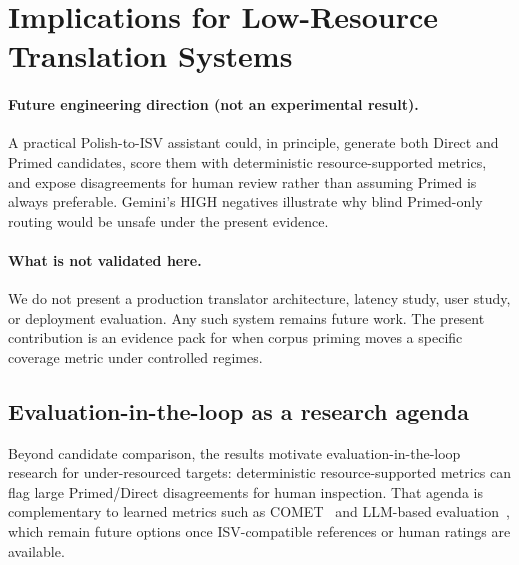 \section{Implications for Low-Resource Translation Systems}
\label{sec:implications}

\paragraph{Future engineering direction (not an experimental result).}
A practical Polish-to-ISV assistant could, in principle, generate both Direct and Primed candidates, score them with deterministic resource-supported metrics, and expose disagreements for human review rather than assuming Primed is always preferable.
Gemini's HIGH negatives illustrate why blind Primed-only routing would be unsafe under the present evidence.

\paragraph{What is not validated here.}
We do not present a production translator architecture, latency study, user study, or deployment evaluation.
Any such system remains future work.
The present contribution is an evidence pack for when corpus priming moves a specific coverage metric under controlled regimes.


\subsection{Evaluation-in-the-loop as a research agenda}
Beyond candidate comparison, the results motivate evaluation-in-the-loop research for under-resourced targets: deterministic resource-supported metrics can flag large Primed/Direct disagreements for human inspection.
That agenda is complementary to learned metrics such as COMET~\citep{rei-etal-2020-comet} and LLM-based evaluation~\citep{kocmi-federmann-2023-large}, which remain future options once ISV-compatible references or human ratings are available.
